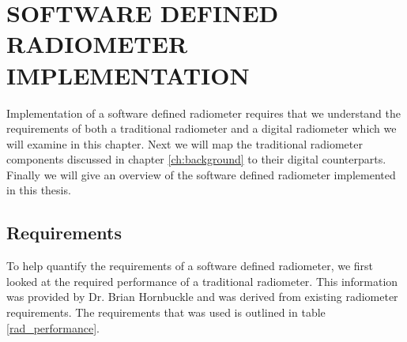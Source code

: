 \chapter{SOFTWARE DEFINED RADIOMETER IMPLEMENTATION}\label{ch:implementation}

Implementation of a software defined radiometer requires that we understand the requirements of both a traditional radiometer and a digital radiometer which we will examine in this chapter.  Next we will map the traditional radiometer components discussed in chapter \ref{ch:background} to their digital counterparts.  Finally we will give an overview of the software defined radiometer implemented in this thesis.



\section{Requirements}\label{requirements}

To help quantify the requirements of a software defined radiometer, we first looked at the required performance of a traditional radiometer.  This information was provided by Dr. Brian Hornbuckle and was derived from existing radiometer requirements.  The requirements that was used is outlined in table \ref{rad_performance}.


